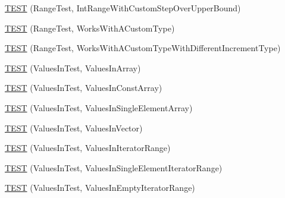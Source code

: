 \begin{DoxyCompactItemize}
\item 
\mbox{\hyperlink{_obj__test_2lib_2googletest-release-1_88_81_2googletest_2test_2googletest-param-test-test_8cc_a87b9e66f957ddc505fc81cb14fd72339}{T\+E\+ST}} (Range\+Test, Int\+Range\+With\+Custom\+Step\+Over\+Upper\+Bound)
\item 
\mbox{\hyperlink{_obj__test_2lib_2googletest-release-1_88_81_2googletest_2test_2googletest-param-test-test_8cc_ae3c8adabec91bd63fd719e116c279eac}{T\+E\+ST}} (Range\+Test, Works\+With\+A\+Custom\+Type)
\item 
\mbox{\hyperlink{_obj__test_2lib_2googletest-release-1_88_81_2googletest_2test_2googletest-param-test-test_8cc_a88be7527c7d77f3c89f80d84c80fd405}{T\+E\+ST}} (Range\+Test, Works\+With\+A\+Custom\+Type\+With\+Different\+Increment\+Type)
\item 
\mbox{\hyperlink{_obj__test_2lib_2googletest-release-1_88_81_2googletest_2test_2googletest-param-test-test_8cc_abfcf3f3f6fcd742e3e85daf552f02b40}{T\+E\+ST}} (Values\+In\+Test, Values\+In\+Array)
\item 
\mbox{\hyperlink{_obj__test_2lib_2googletest-release-1_88_81_2googletest_2test_2googletest-param-test-test_8cc_aeeb7ce0b55e6d2cfc439149470c7af16}{T\+E\+ST}} (Values\+In\+Test, Values\+In\+Const\+Array)
\item 
\mbox{\hyperlink{_obj__test_2lib_2googletest-release-1_88_81_2googletest_2test_2googletest-param-test-test_8cc_ada74720d1b4b4c63cf08033f4509561b}{T\+E\+ST}} (Values\+In\+Test, Values\+In\+Single\+Element\+Array)
\item 
\mbox{\hyperlink{_obj__test_2lib_2googletest-release-1_88_81_2googletest_2test_2googletest-param-test-test_8cc_a562952744cd40b914d6547e83003c257}{T\+E\+ST}} (Values\+In\+Test, Values\+In\+Vector)
\item 
\mbox{\hyperlink{_obj__test_2lib_2googletest-release-1_88_81_2googletest_2test_2googletest-param-test-test_8cc_a231a43db61584a3f11662bdc78b6cc77}{T\+E\+ST}} (Values\+In\+Test, Values\+In\+Iterator\+Range)
\item 
\mbox{\hyperlink{_obj__test_2lib_2googletest-release-1_88_81_2googletest_2test_2googletest-param-test-test_8cc_a38f446e378a9ff60bd6a1df2d533a1df}{T\+E\+ST}} (Values\+In\+Test, Values\+In\+Single\+Element\+Iterator\+Range)
\item 
\mbox{\hyperlink{_obj__test_2lib_2googletest-release-1_88_81_2googletest_2test_2googletest-param-test-test_8cc_aed44e3d25084500088fb9cb99e189939}{T\+E\+ST}} (Values\+In\+Test, Values\+In\+Empty\+Iterator\+Range)
\item 

\end{DoxyCompactItemize}
